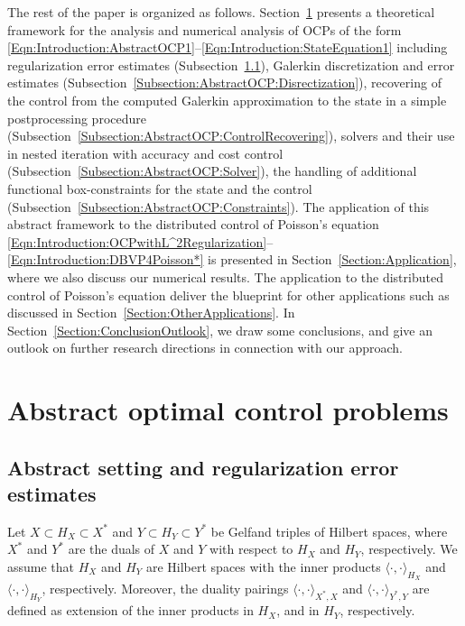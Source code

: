 \documentclass{article}
\numberwithin{equation}{section}
\begin{document}
The rest of the paper is organized as follows.
Section~\ref{Section:AbstractOCP} presents a theoretical framework 
for the analysis and numerical analysis of OCPs of the form
\eqref{Eqn:Introduction:AbstractOCP1}--\eqref{Eqn:Introduction:StateEquation1}
including regularization error estimates
(Subsection~\ref{Subsection:AbstractOCP:Setting}),
Galerkin discretization and error estimates
(Subsection~\ref{Subsection:AbstractOCP:Disrectization}),
recovering of the control from the computed Galerkin approximation to the
state in a simple postprocessing procedure
(Subsection~\ref{Subsection:AbstractOCP:ControlRecovering}), solvers and
their use in nested iteration with accuracy and cost control
(Subsection~\ref{Subsection:AbstractOCP:Solver}), 
the handling of additional functional box-constraints for the state and
the control (Subsection~\ref{Subsection:AbstractOCP:Constraints}).
The application of this abstract framework to the distributed control of 
Poisson's equation \eqref{Eqn:Introduction:OCPwithL^2Regularization}--\eqref{Eqn:Introduction:DBVP4Poisson*}
is presented in Section~\ref{Section:Application}, 
where we also discuss our numerical results.
The application to the distributed control of Poisson's equation deliver
the blueprint  for other applications such as discussed in
Section~\ref{Section:OtherApplications}.
In Section~\ref{Section:ConclusionOutlook}, we draw some conclusions,
and give an outlook on further research directions in connection
with our approach.

\section{Abstract optimal control problems}
\label{Section:AbstractOCP}

\subsection{Abstract setting and regularization error estimates}
\label{Subsection:AbstractOCP:Setting}
Let $X \subset H_X \subset X^*$ and $Y \subset H_Y \subset Y^*$ be Gelfand
triples of Hilbert spaces, where $X^*$ and $Y^*$ are the duals of $X$ and
$Y$ with respect to $H_X$ and $H_Y$, respectively. We assume that
$H_X$ and $H_Y$ are Hilbert spaces with the inner products
$\langle \cdot , \cdot \rangle_{H_X}$ and $\langle \cdot, \cdot \rangle_{H_Y}$,
respectively. Moreover, the duality pairings
$\langle \cdot , \cdot \rangle_{X^*,X}$ and $\langle \cdot , \cdot
\rangle_{Y^*,Y}$ are defined as extension of the inner products in $H_X$, and
in $H_Y$, respectively.
\end{document}
